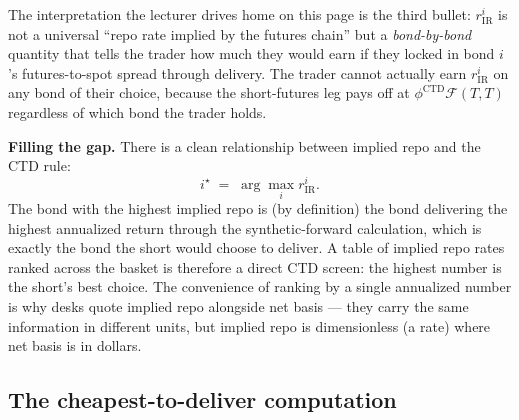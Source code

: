 The interpretation the lecturer drives home on this page is the third
bullet: $r^i_{\text{IR}}$ is not a universal ``repo rate implied by the
futures chain'' but a \emph{bond-by-bond} quantity that tells the trader
how much they would earn if they locked in bond $i$'s futures-to-spot
spread through delivery. The trader cannot actually earn $r^i_{\text{IR}}$
on any bond of their choice, because the short-futures leg pays off at
$\phi^{\text{CTD}}\mathcal{F}(T,T)$ regardless of which bond the trader
holds.

\begin{tipblock}
\textbf{Filling the gap.} There is a clean relationship between implied
repo and the CTD rule:
\[
   i^\star \;=\; \arg\max_i r^i_{\text{IR}}.
\]
The bond with the highest implied repo is (by definition) the bond
delivering the highest annualized return through the synthetic-forward
calculation, which is exactly the bond the short would choose to deliver.
A table of implied repo rates ranked across the basket is therefore a
direct CTD screen: the highest number is the short's best choice. The
convenience of ranking by a single annualized number is why desks quote
implied repo alongside net basis --- they carry the same information in
different units, but implied repo is dimensionless (a rate) where net
basis is in dollars.
\end{tipblock}

\subsection{The cheapest-to-deliver computation}\label{L4-sec:tf-ctd}

